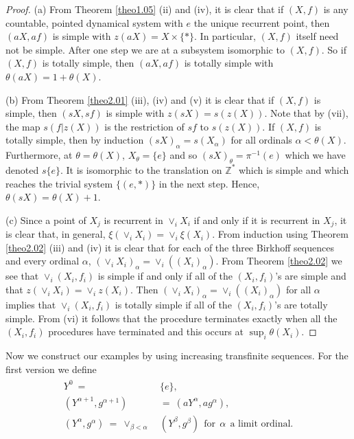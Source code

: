 \documentclass[12pt]{amsart}
\def \Z {\mathbb Z}
\def \a {\alpha }
\def \b {\beta}
\def \th {\theta}
\numberwithin{equation}{section}
\begin{document}
\begin{proof} (a) From Theorem \ref{theo1.05} (ii) and (iv), it is clear that if $(X, f)$ is any countable, pointed dynamical
system with $e$ the unique recurrent point, then $(aX, af)$ is simple with $z(aX) =   X \times \{ * \}$. In particular, $(X,f)$ itself need not be simple.
After one step we are at a subsystem isomorphic to $(X,f)$. So if $(X,f)$ is totally simple, then $(aX, af)$ is totally simple with
$\th(aX) = 1 + \th(X)$.

(b) From Theorem \ref{theo2.01} (iii),  (iv) and (v) it is clear that if $(X, f)$ is simple, then $(sX, sf)$ is simple with
$z(sX) = s(z(X))$. Note that by (vii), the map $s(f|z(X))$ is the restriction of $sf$ to $s(z(X))$. If $(X,f)$ is totally simple,
then by induction $(sX)_{\a} = s(X_{\a})$ for all ordinals $\a < \th(X)$. Furthermore, at $\th = \th(X)$, $X_{\th} = \{ e \}$ and
so $(sX)_{\th} = \pi^{-1}(e)$ which we have denoted $s\{ e \}$. It is isomorphic to the translation on $\Z^*$ which is simple and which
reaches the trivial system $\{ (e, *) \}$ in the next step. Hence, $\th(sX) = \th(X) + 1$.

(c) Since a point of $X_j$ is recurrent in $\vee_i X_i$ if and only if it is recurrent in $X_j$, it is clear that, in general,
 $\xi(\vee_i X_i) = \vee_i \xi(X_i)$. From induction using Theorem \ref{theo2.02} (iii) and (iv) it is clear that for each of
 the three Birkhoff sequences and every ordinal $\a$, $(\vee_i X_i)_{\a} = \vee_i ((X_i)_{\a})$. From Theorem \ref{theo2.02} we see
  that $\vee_i (X_i, f_i)$  is simple if and only if all of the $(X_i, f_i)$'s are simple and that
$z(\vee_i X_i) = \vee_i z(X_i)$. Then $(\vee_i X_i)_{\a} = \vee_i ((X_i)_{\a})$ for all $\a$ implies that
$\vee_i (X_i, f_i)$  is totally simple if  all of the $(X_i, f_i)$'s are totally simple. From (vi) it follows that the
procedure terminates exactly when all the $(X_i, f_i)$ procedures have terminated and this occurs at $\sup_i \th(X_i)$.

\end{proof}\vspace{.25cm}

Now we construct our examples by using increasing transfinite sequences. For the first version we define
\begin{align}\label{eq3.06}\begin{split}
Y^0 \  = \ & \{ e \}, \\
(Y^{\a+1},g^{\a+1}) \ & = \ (aY^{\a},ag^{\a}),  \\
(Y^{\a}, g^{\a}) \  = \ \vee_{\b < \a} \  & (Y^{\b},  g^{\b}) \ \  \text{for} \ \   \a \ \ \text{a limit ordinal}.
 \end{split} \end{align}
\end{document}
